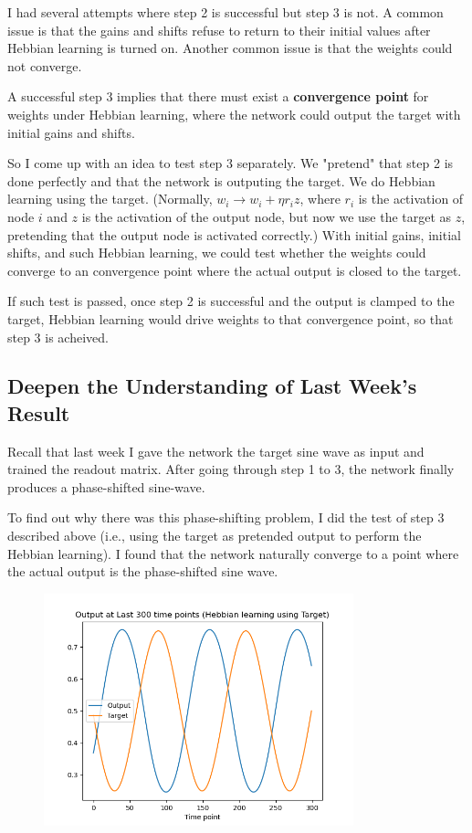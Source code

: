 \documentclass[12pt, a4paper]{article}
\begin{document}
I had several attempts where step 2 is successful but step 3 is not. A common issue is that the gains and shifts refuse to return to their initial values after Hebbian learning is turned on. Another common issue is that the weights could not converge.

A successful step 3 implies that there must exist a \textbf{convergence point} for weights under Hebbian learning, where the network could output the target with initial gains and shifts.

So I come up with an idea to test step 3 separately. We "pretend" that step 2 is done perfectly and that the network is outputing the target. We do Hebbian learning using the target. (Normally, $w_{i} \rightarrow w_{i} + \eta r_i z$, where $r_i$ is the activation of node $i$ and $z$ is the activation of the output node, but now we use the target as $z$, pretending that the output node is activated correctly.) With initial gains, initial shifts, and such Hebbian learning, we could test whether the weights could converge to an convergence point where the actual output is closed to the target.

If such test is passed, once step 2 is successful and the output is clamped to the target, Hebbian learning would drive weights to that convergence point, so that step 3 is acheived.

\newpage

\subsection*{Deepen the Understanding of Last Week's Result}

Recall that last week I gave the network the target sine wave as input and trained the readout matrix. After going through step 1 to 3, the network finally produces a phase-shifted sine-wave. 

To find out why there was this phase-shifting problem, I did the test of step 3 described above (i.e., using the target as pretended output to perform the Hebbian learning). I found that the network naturally converge to a point where the actual output is the phase-shifted sine wave.

\begin{figure}[H]
    \centering
    \includegraphics[width=0.8\textwidth]{RNN/FORCE/fig/FORCE_targethebb_lastoutput.png} \\
\end{figure}
\end{document}
